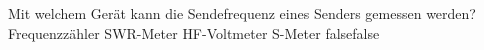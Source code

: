     {Mit welchem Gerät kann die Sendefrequenz eines Senders gemessen werden?  }
    {Frequenzzähler}
    {SWR-Meter}
    {HF-Voltmeter}
    {S-Meter}
    {false}{false}